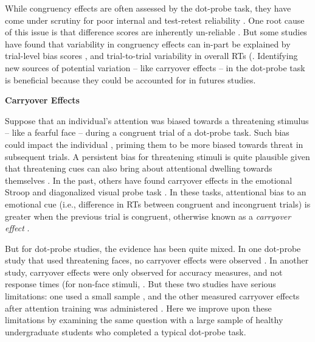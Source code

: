 \documentclass{article}
\begin{document}
While congruency effects are often assessed by the dot-probe task, \parencite{Kruijt2018}\parencite{Mogg2017} they have come under scrutiny for poor internal and test-retest reliability \parencite{Schmukle2005}\parencite{Staugaard2009}. One root cause of this issue is that difference scores are inherently un-reliable \parencite{Hedge2018}. But some studies have found that variability in congruency effects can in-part be explained by trial-level bias scores \parencite{Zvielli2015}, and trial-to-trial variability in overall RTs (\parencite{Carlson2020}\parencite{Kruijt2016}. Identifying new sources of potential variation -- like carryover effects -- in the dot-probe task is beneficial because they could be accounted for in futures studies.

\textbf{Carryover Effects}

Suppose that an individual's attention was biased towards a threatening stimulus -- like a fearful face -- during a congruent trial of a dot-probe task. Such bias could impact the individual \parencite{Panksepp2011}, priming them to be more biased towards threat in subsequent trials. A persistent bias for threatening stimuli is quite plausible given that threatening cues can also bring about attentional dwelling towards themselves \parencite{Carlson2014}\parencite{Fox2001}. In the past, others have found carryover effects in the emotional Stroop \parencite{Cane2009}\parencite{Clarke2015}\parencite{Waters2005}\parencite{Wilson2007} and diagonalized visual probe task \parencite{Gladwin2019}\parencite{Gladwin2020}\parencite{Gladwin2019}. In these tasks, attentional bias to an emotional cue (i.e., difference in RTs between congruent and incongruent trials) is greater when the previous trial is congruent, otherwise known as a \emph{carryover effect }\parencite{Gladwin2019}.

But for dot-probe studies, the evidence has been quite mixed. In one dot-probe study that used threatening faces, no carryover effects were observed \parencite{Hill2016}. In another study, carryover effects were only observed for accuracy measures, and not response times (for non-face stimuli, \parencite{Gladwin2017}. But these two studies have serious limitations: one used a small sample \parencite{Gladwin2017}, and the other measured carryover effects after attention training was administered \parencite{Hill2016}. Here we improve upon these limitations by examining the same question with a large sample of healthy undergraduate students who completed a typical dot-probe task.
\end{document}
